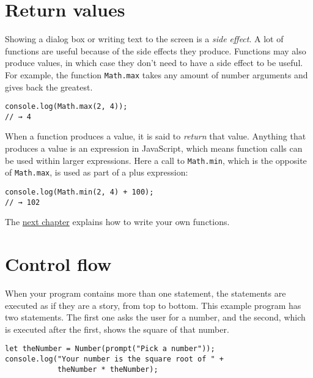 \label{program_structure.return_values}\section{Return values}

Showing a dialog box or writing text to the screen is a \emph{side
effect}. A lot of functions are useful because of the side effects they produce. Functions may also produce values, in which case they don't need to have a side effect to be useful. For example, the function \lstinline`Math.max` takes any amount of number arguments and gives back the greatest.

\begin{lstlisting}
console.log(Math.max(2, 4));
// → 4
\end{lstlisting}
\noindent{}

When a function produces a value, it is said to \emph{return} that value. Anything that produces a value is an expression in JavaScript, which means function calls can be used within larger expressions. Here a call to \lstinline`Math.min`, which is the opposite of \lstinline`Math.max`, is used as part of a plus expression:

\begin{lstlisting}
console.log(Math.min(2, 4) + 100);
// → 102
\end{lstlisting}
\noindent

The \hyperref[functions]{next chapter} explains how to write your own functions.

\section{Control flow}

When your program contains more than one statement, the statements are executed as if they are a story, from top to bottom. This example program has two statements. The first one asks the user for a number, and the second, which is executed after the first, shows the square of that number.

\begin{lstlisting}
let theNumber = Number(prompt("Pick a number"));
console.log("Your number is the square root of " +
            theNumber * theNumber);
\end{lstlisting}
\noindent{}

